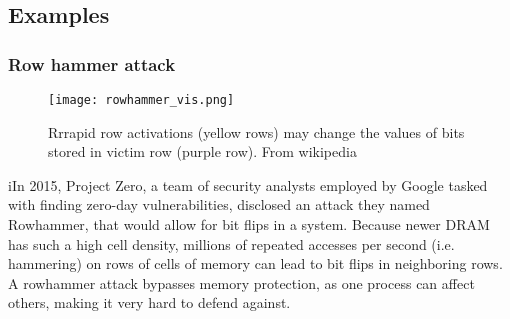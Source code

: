 \subsection{Examples}
\subsubsection{Row hammer attack}

\begin{figure}
  \begin{center}
    \texttt{[image: rowhammer\_vis.png]}
  \end{center}
  \caption{Rrrapid row activations (yellow rows) may change the values of bits stored in victim row (purple row). \hspace{\textwidth} From wikipedia \cite{wiki_rowhammer}}
\end{figure}

iIn 2015, Project Zero, a team of security analysts employed by Google tasked with finding zero-day vulnerabilities, disclosed an attack they named Rowhammer, that would allow for bit flips in a system.
Because newer DRAM has such a high cell density, millions of repeated accesses per second (i.e. hammering) on rows of cells of memory can lead to bit flips in neighboring rows.
A rowhammer attack bypasses memory protection, as one process can affect others, making it very hard to defend against.

%

